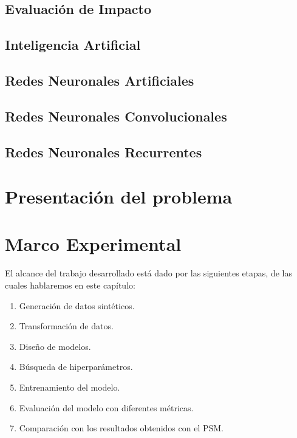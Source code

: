 \documentclass[a4paper,12pt,spanish]{book}
\begin{document}
\section{Evaluación de Impacto}


\section{Inteligencia Artificial}


\section{Redes Neuronales Artificiales}



\section{Redes Neuronales Convolucionales}


\section{Redes Neuronales Recurrentes}


% 


\chapter{Presentación del problema} \label{sec:problema}



\chapter{Marco Experimental}
El alcance del trabajo desarrollado está dado por las siguientes etapas, de las
cuales hablaremos en este capítulo:
\begin{enumerate}
    \item Generación de datos sintéticos.
    \item Transformación de datos.
    \item Diseño de modelos.
    \item Búsqueda de hiperparámetros.
    \item Entrenamiento del modelo.
    \item Evaluación del modelo con diferentes métricas.
    \item Comparación con los resultados obtenidos con el PSM.
\end{enumerate}
\end{document}
